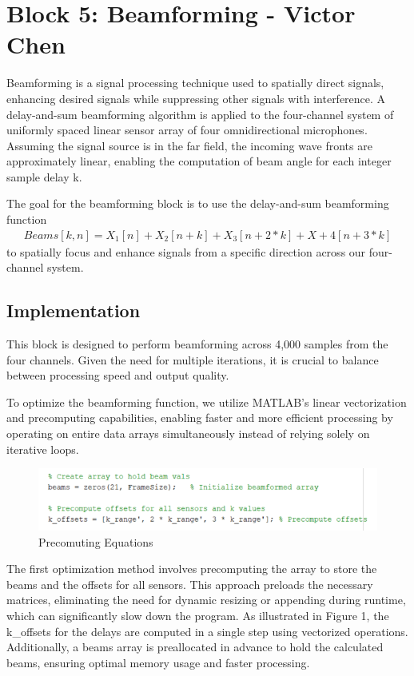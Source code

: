 
\section{Block 5: Beamforming - Victor Chen}

Beamforming is a signal processing technique used to spatially direct signals, enhancing desired signals while suppressing other signals with interference. A delay-and-sum beamforming algorithm is applied to the four-channel system of uniformly spaced linear sensor array of four omnidirectional microphones. Assuming the signal source is in the far field, the incoming wave fronts are approximately linear, enabling the computation of beam angle for each integer sample delay k.

The goal for the beamforming block is to use the delay-and-sum beamforming function 
\begin{align*}
    Beams[k,n] = X_1[n]+X_2[n+k]+X_3[n+2*k]+X+4[n+3*k]
\end{align*}
to spatially focus and enhance signals from a specific direction across our four-channel system.


\subsection{Implementation}

This block is designed to perform beamforming across 4,000 samples from the four channels. Given the need for multiple iterations, it is crucial to balance between processing speed and output quality.

To optimize the beamforming function, we utilize \textsc{MATLAB}'s linear vectorization and precomputing capabilities, enabling faster and more efficient processing by operating on entire data arrays simultaneously instead of relying solely on iterative loops.

\begin{figure}[H]
    \centering
    \includegraphics[width=0.5\linewidth]{figures/beamform_fig1.png}
    \caption{Precomuting Equations}
    \label{fig:precomputing_equations}
\end{figure}

The first optimization method involves precomputing the array to store the beams and the offsets for all sensors. This approach preloads the necessary matrices, eliminating the need for dynamic resizing or appending during runtime, which can significantly slow down the program. As illustrated in Figure 1, the k\_offsets for the delays are computed in a single step using vectorized operations. Additionally, a beams array is preallocated in advance to hold the calculated beams, ensuring optimal memory usage and faster processing.

